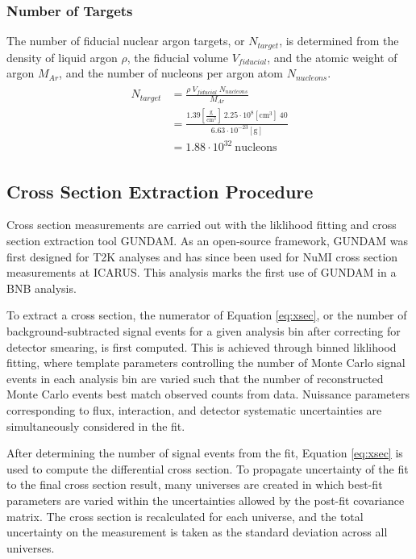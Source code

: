 \documentclass[../main.tex]{subfiles}
\begin{document}
\subsubsection{Number of Targets}
The number of fiducial nuclear argon targets, or $N_{target}$, is determined from the density of liquid argon $\rho$, the fiducial volume $V_{fiducial}$, and the atomic weight of argon $M_{Ar}$, and the number of nucleons per argon atom $N_{nucleons}$.
\begin{align}
\begin{split}
    N_{target} &= \frac{\rho \ V_{fiducial} \ N_{nucleons}}{M_{Ar}} \\
    &= \frac{1.39 [\frac{\text{g}}{\text{cm}^{3}}] \ 2.25 \cdot 10^{8} [\text{cm}^{3}] \ 40}{6.63 \cdot 10^{-23} [\text{g}]} \\
    &= 1.88 \cdot 10^{32} \ \text{nucleons}
\end{split}
\end{align}

\subsection{Cross Section Extraction Procedure}
Cross section measurements are carried out with the liklihood fitting and cross section extraction tool GUNDAM.  As an open-source framework, GUNDAM was first designed for T2K analyses and has since been used for NuMI cross section measurements at ICARUS.  This analysis marks the first use of GUNDAM in a BNB analysis.

To extract a cross section, the numerator of Equation \eqref{eq:xsec}, or the number of background-subtracted signal events for a given analysis bin after correcting for detector smearing, is first computed.  This is achieved through binned liklihood fitting, where template parameters controlling the number of Monte Carlo signal events in each analysis bin are varied such that the number of reconstructed Monte Carlo events best match observed counts from data.  Nuissance parameters corresponding to flux, interaction, and detector systematic uncertainties are simultaneously considered in the fit.

After determining the number of signal events from the fit, Equation \eqref{eq:xsec} is used to compute the differential cross section.  To propagate uncertainty of the fit to the final cross section result, many universes are created in which best-fit parameters are varied within the uncertainties allowed by the post-fit covariance matrix.  The cross section is recalculated for each universe, and the total uncertainty on the measurement is taken as the standard deviation across all universes.
\end{document}
